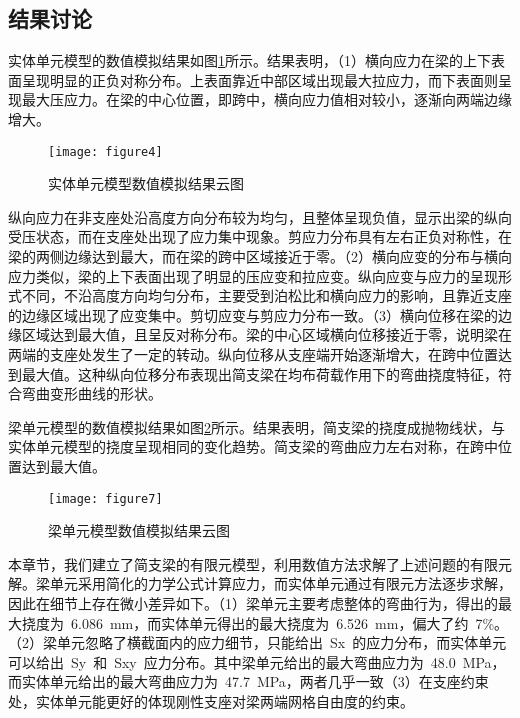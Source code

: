 \subsection{结果讨论}
\label{cha:discussion2}
实体单元模型的数值模拟结果如图\ref{fig:fea}所示。结果表明，（1）横向应力在梁的上下表面呈现明显的正负对称分布。上表面靠近中部区域出现最大拉应力，而下表面则呈现最大压应力。在梁的中心位置，即跨中，横向应力值相对较小，逐渐向两端边缘增大。
\begin{figure}[htbp]
    \centering
	\texttt{[image: figure4]}
    \caption{实体单元模型数值模拟结果云图}
    \label{fig:fea}
\end{figure}
纵向应力在非支座处沿高度方向分布较为均匀，且整体呈现负值，显示出梁的纵向受压状态，而在支座处出现了应力集中现象。剪应力分布具有左右正负对称性，在梁的两侧边缘达到最大，而在梁的跨中区域接近于零。（2）横向应变的分布与横向应力类似，梁的上下表面出现了明显的压应变和拉应变。纵向应变与应力的呈现形式不同，不沿高度方向均匀分布，主要受到泊松比和横向应力的影响，且靠近支座的边缘区域出现了应变集中。剪切应变与剪应力分布一致。（3）横向位移在梁的边缘区域达到最大值，且呈反对称分布。梁的中心区域横向位移接近于零，说明梁在两端的支座处发生了一定的转动。纵向位移从支座端开始逐渐增大，在跨中位置达到最大值。这种纵向位移分布表现出简支梁在均布荷载作用下的弯曲挠度特征，符合弯曲变形曲线的形状。

梁单元模型的数值模拟结果如图\ref{fig:BEAMfea}所示。结果表明，简支梁的挠度成抛物线状，与实体单元模型的挠度呈现相同的变化趋势。简支梁的弯曲应力左右对称，在跨中位置达到最大值。
\begin{figure}[htbp]
    \centering
	\texttt{[image: figure7]}
    \caption{梁单元模型数值模拟结果云图}
    \label{fig:BEAMfea}
\end{figure}

本章节，我们建立了简支梁的有限元模型，利用数值方法求解了上述问题的有限元解。梁单元采用简化的力学公式计算应力，而实体单元通过有限元方法逐步求解，因此在细节上存在微小差异如下。（1）梁单元主要考虑整体的弯曲行为，得出的最大挠度为~6.086~mm，而实体单元得出的最大挠度为~6.526~mm，偏大了约~7\%。（2）梁单元忽略了横截面内的应力细节，只能给出~Sx~的应力分布，而实体单元可以给出~Sy~和~Sxy~应力分布。其中梁单元给出的最大弯曲应力为~48.0~MPa，而实体单元给出的最大弯曲应力为~47.7~MPa，两者几乎一致（3）在支座约束处，实体单元能更好的体现刚性支座对梁两端网格自由度的约束。
